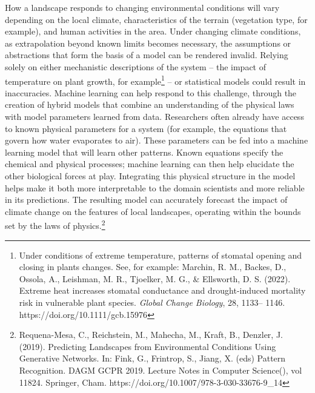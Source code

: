 How a landscape responds to changing environmental conditions will vary
depending on the local climate, characteristics of the terrain
(vegetation type, for example), and human activities in the area. Under
changing climate conditions, as extrapolation beyond known limits
becomes necessary, the assumptions or abstractions that form the basis
of a model can be rendered invalid. Relying solely on either mechanistic
descriptions of the system -- the impact of temperature on plant growth,
for example\footnote{Under conditions of extreme temperature, patterns
  of stomatal opening and closing in plants changes. See, for example:
  Marchin, R. M., Backes, D., Ossola, A., Leishman, M. R., Tjoelker, M.
  G., \& Ellsworth, D. S. (2022). Extreme heat increases stomatal
  conductance and drought-induced mortality risk in vulnerable plant
  species. \emph{Global Change Biology}, 28, 1133-- 1146.
  https://doi.org/10.1111/gcb.15976} -- or statistical models could
result in inaccuracies. Machine learning can help respond to this
challenge, through the creation of hybrid models that combine an
understanding of the physical laws with model parameters learned from
data. Researchers often already have access to known physical parameters
for a system (for example, the equations that govern how water
evaporates to air). These parameters can be fed into a machine learning
model that will learn other patterns. Known equations specify the
chemical and physical processes; machine learning can then help
elucidate the other biological forces at play. Integrating this physical
structure in the model helps make it both more interpretable to the
domain scientists and more reliable in its predictions. The resulting
model can accurately forecast the impact of climate change on the
features of local landscapes, operating within the bounds set by the
laws of physics.\footnote{Requena-Mesa, C., Reichstein, M., Mahecha, M.,
  Kraft, B., Denzler, J. (2019). Predicting Landscapes from
  Environmental Conditions Using Generative Networks. In: Fink, G.,
  Frintrop, S., Jiang, X. (eds) Pattern Recognition. DAGM GCPR 2019.
  Lecture Notes in Computer Science(), vol 11824. Springer, Cham.
  https://doi.org/10.1007/978-3-030-33676-9\_14}

